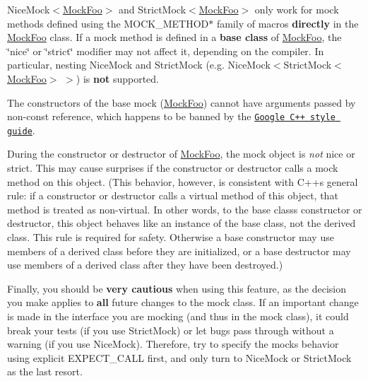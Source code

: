 \begin{DoxyEnumerate}
\item {\ttfamily Nice\+Mock$<$\hyperlink{classMockFoo}{Mock\+Foo}$>$} and {\ttfamily Strict\+Mock$<$\hyperlink{classMockFoo}{Mock\+Foo}$>$} only work for mock methods defined using the {\ttfamily M\+O\+C\+K\+\_\+\+M\+E\+T\+H\+O\+D$\ast$} family of macros {\bfseries directly} in the {\ttfamily \hyperlink{classMockFoo}{Mock\+Foo}} class. If a mock method is defined in a {\bfseries base class} of {\ttfamily \hyperlink{classMockFoo}{Mock\+Foo}}, the \char`\"{}nice\char`\"{} or \char`\"{}strict\char`\"{} modifier may not affect it, depending on the compiler. In particular, nesting {\ttfamily Nice\+Mock} and {\ttfamily Strict\+Mock} (e.\+g. {\ttfamily Nice\+Mock$<$Strict\+Mock$<$\hyperlink{classMockFoo}{Mock\+Foo}$>$ $>$}) is {\bfseries not} supported.
\end{DoxyEnumerate}
\begin{DoxyEnumerate}
\item The constructors of the base mock ({\ttfamily \hyperlink{classMockFoo}{Mock\+Foo}}) cannot have arguments passed by non-\/const reference, which happens to be banned by the \href{http://google-styleguide.googlecode.com/svn/trunk/cppguide.xml}{\tt Google C++ style guide}.
\end{DoxyEnumerate}
\begin{DoxyEnumerate}
\item During the constructor or destructor of {\ttfamily \hyperlink{classMockFoo}{Mock\+Foo}}, the mock object is {\itshape not} nice or strict. This may cause surprises if the constructor or destructor calls a mock method on {\ttfamily this} object. (This behavior, however, is consistent with C++\textquotesingle{}s general rule\+: if a constructor or destructor calls a virtual method of {\ttfamily this} object, that method is treated as non-\/virtual. In other words, to the base class\textquotesingle{}s constructor or destructor, {\ttfamily this} object behaves like an instance of the base class, not the derived class. This rule is required for safety. Otherwise a base constructor may use members of a derived class before they are initialized, or a base destructor may use members of a derived class after they have been destroyed.)
\end{DoxyEnumerate}

Finally, you should be {\bfseries very cautious} when using this feature, as the decision you make applies to {\bfseries all} future changes to the mock class. If an important change is made in the interface you are mocking (and thus in the mock class), it could break your tests (if you use {\ttfamily Strict\+Mock}) or let bugs pass through without a warning (if you use {\ttfamily Nice\+Mock}). Therefore, try to specify the mock\textquotesingle{}s behavior using explicit {\ttfamily E\+X\+P\+E\+C\+T\+\_\+\+C\+A\+LL} first, and only turn to {\ttfamily Nice\+Mock} or {\ttfamily Strict\+Mock} as the last resort.

